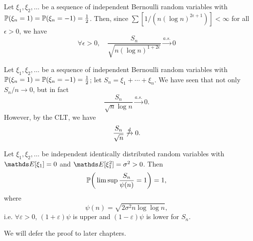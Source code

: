 \begin{example}
Let $\xi_1, \xi_2, \dots$ be a sequence of independent Bernoulli random variables with $\mathbb{P}(\xi_n = 1) = \mathbb{P}(\xi_n = -1) = \frac12$. Then, since $\sum [1/(n (\log n)^{2\epsilon + 1})] < \infty$ for all $\epsilon > 0$, we have
\begin{equation*}
    \forall \epsilon > 0, \quad \frac{S_n}{\sqrt{n (\log n)^{1+2\epsilon}}} \xrightarrow{a.s.} 0
\end{equation*}
\end{example}

Let $\xi_1, \xi_2, \dots$ be a sequence of independent Bernoulli random variables with $\mathbb{P}(\xi_n = 1) = \mathbb{P}(\xi_n = -1) = \frac12$; let $S_n = \xi_1 + \cdots + \xi_n$. We have seen that not only $S_n/n \to 0$, but in fact
\begin{equation*}
    \frac{S_n}{\sqrt{n}\log n} \xrightarrow{a.s.} 0.
\end{equation*}
However, by the CLT, we have
\begin{equation*}
    \frac{S_n}{\sqrt{n}} \not\xrightarrow{d} 0.
\end{equation*}

\begin{theorem}
Let $\xi_1, \xi_2, \dots$ be independent identically distributed random variables with $\E[\xi_1] = 0$ and $\E[\xi_1^2] = \sigma^2 > 0$. Then 
\begin{equation*}
    \mathbb{P} \bigg(\limsup \frac{S_n}{\psi(n)} = 1\bigg) = 1,
\end{equation*}
where 
\begin{equation*}
    \psi(n) = \sqrt{2 \sigma^2 n \log \log n},
\end{equation*}
i.e. $\forall \varepsilon > 0$, $(1 + \varepsilon) \psi$ is upper and $(1 - \varepsilon) \psi$ is lower for $S_n$.
\end{theorem}

We will defer the proof to later chapters.
\newpage